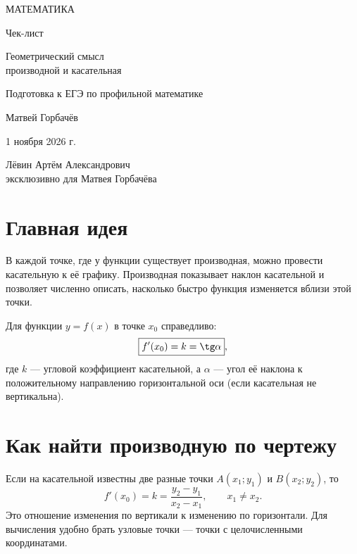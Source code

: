 \documentclass[a4paper,12pt]{article}
\newcommand{\key}[1]{\textcolor{darkaccent}{#1}}
\begin{document}
\begin{titlepage}
\thispagestyle{empty}
\centering
\vspace*{23mm}
{\large\color{darkaccent}МАТЕМАТИКА\par}
\vspace{20mm}
{\LARGE Чек-лист\par}
\vspace{16mm}
{\LARGE\color{accent}Геометрический смысл\\[3pt] производной и касательная\par}
\vspace{16mm}
{\normalsize Подготовка к ЕГЭ по профильной математике\par}
\vfill
{\large Матвей Горбачёв\par}
\vspace{10mm}
{\normalsize 1 ноября 2026 г.\par}
\vspace{14mm}
{\small Лёвин Артём Александрович\\[-1pt]
эксклюзивно для Матвея Горбачёва\par}
\end{titlepage}
\setcounter{page}{1}

\section{Главная идея}
В каждой точке, где у функции существует производная, можно провести касательную к её графику. \key{Производная показывает наклон касательной} и позволяет численно описать, насколько быстро функция изменяется вблизи этой точки.

Для функции $y=f(x)$ в точке $x_0$ справедливо:
\[
\boxed{\displaystyle f'(x_0)=k=\tg\alpha},
\]
где $k$ --- угловой коэффициент касательной, а $\alpha$ --- угол её наклона к положительному направлению горизонтальной оси (если касательная не вертикальна).

\section{Как найти производную по чертежу}
Если на касательной известны две разные точки $A(x_1;y_1)$ и $B(x_2;y_2)$, то
\[
\boxed{\displaystyle f'(x_0)=k=\frac{y_2-y_1}{x_2-x_1}},\qquad x_1\ne x_2.
\]
Это отношение изменения по вертикали к изменению по горизонтали. Для вычисления удобно брать \key{узловые точки} --- точки с целочисленными координатами.
\end{document}
